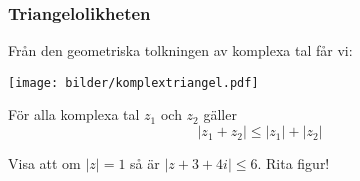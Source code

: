\documentclass[slidestop,blue,handout,9pt]{beamer}
\begin{document}
\begin{frame}
\frametitle{Triangelolikheten}

Från den geometriska tolkningen av komplexa tal får vi:
\begin{center}
\texttt{[image: bilder/komplextriangel.pdf]}  
\end{center}
\begin{sats}[Triangelolikheten]
För alla komplexa tal $z_1$ och $z_2$ gäller 
\begin{equation*}
|z_1 + z_2| \leq |z_1| + |z_2|
\end{equation*}
\end{sats}


\begin{exempel}
Visa att om $|z| = 1$ så är $|z + 3 + 4i| \leq 6$. Rita figur!
\end{exempel}
\end{frame}
\end{document}
